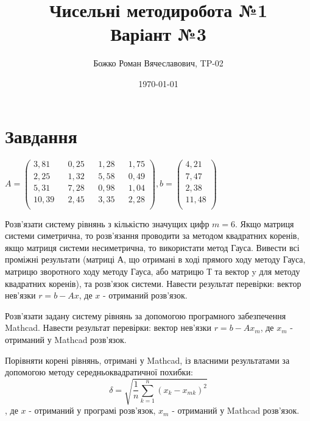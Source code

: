 \documentclass{report}
\begin{document}
\title{Чисельні методи робота №1\\Варіант №3}
\author{Божко Роман Вячеславович, TP-02}
\date{\today}

\maketitle

\section*{Завдання}
$A = 
\begin{pmatrix}
3,81 && 0,25 && 1,28 && 1,75\\
2,25 && 1,32 && 5,58 && 0,49\\
5,31 && 7,28 && 0,98 && 1,04\\
10,39 && 2,45 && 3,35 && 2,28\\
\end{pmatrix}, b = 
\begin{pmatrix}
4,21\\
7,47\\
2,38\\
11,48\\
\end{pmatrix}
$\par
Розв’язати систему рівнянь з кількістю значущих цифр $m = 6$. Якщо матриця системи симетрична, то розв’язання проводити за методом квадратних коренів, якщо матриця системи несиметрична, то використати метод Гауса. Вивести всі проміжні результати (матриці А, що отримані в ході прямого ходу методу Гауса, матрицю зворотного ходу методу Гауса, або матрицю Т та вектор y для методу квадратних коренів), та розв’язок системи. Навести результат перевірки: вектор нев’язки $r = b - Ax$, де $x$ - отриманий розв’язок.\par
	Розв’язати задану систему рівнянь за допомогою програмного забезпечення Mathcad. Навести результат перевірки: вектор нев’язки $r = b - Ax_m$, де $x_m$ - отриманий у Mathcad розв’язок.\par
	Порівняти корені рівнянь, отримані у Mathcad, із власними результатами за допомогою методу середньоквадратичної похибки:
\[\delta=\sqrt{\frac{1}{n}\sum_{k=1}^{n} (x_k - x_{mk})^2}\],
де $x$ - отриманий у програмі розв’язок, $x_m$ - отриманий у Mathcad розв’язок.
\end{document}
